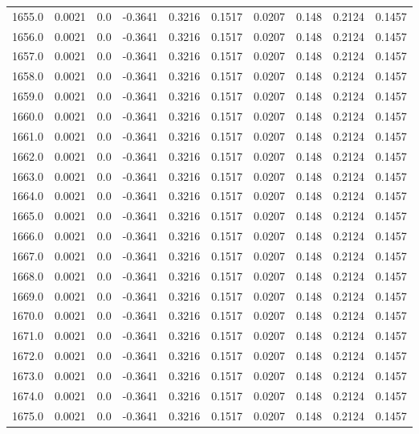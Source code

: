 \begin{longtable}{lrrrrrrrrr}
1655.0 & 0.0021 & 0.0 & -0.3641 & 0.3216 & 0.1517 & 0.0207 & 0.148 & 0.2124 & 0.1457 \\
1656.0 & 0.0021 & 0.0 & -0.3641 & 0.3216 & 0.1517 & 0.0207 & 0.148 & 0.2124 & 0.1457 \\
1657.0 & 0.0021 & 0.0 & -0.3641 & 0.3216 & 0.1517 & 0.0207 & 0.148 & 0.2124 & 0.1457 \\
1658.0 & 0.0021 & 0.0 & -0.3641 & 0.3216 & 0.1517 & 0.0207 & 0.148 & 0.2124 & 0.1457 \\
1659.0 & 0.0021 & 0.0 & -0.3641 & 0.3216 & 0.1517 & 0.0207 & 0.148 & 0.2124 & 0.1457 \\
1660.0 & 0.0021 & 0.0 & -0.3641 & 0.3216 & 0.1517 & 0.0207 & 0.148 & 0.2124 & 0.1457 \\
1661.0 & 0.0021 & 0.0 & -0.3641 & 0.3216 & 0.1517 & 0.0207 & 0.148 & 0.2124 & 0.1457 \\
1662.0 & 0.0021 & 0.0 & -0.3641 & 0.3216 & 0.1517 & 0.0207 & 0.148 & 0.2124 & 0.1457 \\
1663.0 & 0.0021 & 0.0 & -0.3641 & 0.3216 & 0.1517 & 0.0207 & 0.148 & 0.2124 & 0.1457 \\
1664.0 & 0.0021 & 0.0 & -0.3641 & 0.3216 & 0.1517 & 0.0207 & 0.148 & 0.2124 & 0.1457 \\
1665.0 & 0.0021 & 0.0 & -0.3641 & 0.3216 & 0.1517 & 0.0207 & 0.148 & 0.2124 & 0.1457 \\
1666.0 & 0.0021 & 0.0 & -0.3641 & 0.3216 & 0.1517 & 0.0207 & 0.148 & 0.2124 & 0.1457 \\
1667.0 & 0.0021 & 0.0 & -0.3641 & 0.3216 & 0.1517 & 0.0207 & 0.148 & 0.2124 & 0.1457 \\
1668.0 & 0.0021 & 0.0 & -0.3641 & 0.3216 & 0.1517 & 0.0207 & 0.148 & 0.2124 & 0.1457 \\
1669.0 & 0.0021 & 0.0 & -0.3641 & 0.3216 & 0.1517 & 0.0207 & 0.148 & 0.2124 & 0.1457 \\
1670.0 & 0.0021 & 0.0 & -0.3641 & 0.3216 & 0.1517 & 0.0207 & 0.148 & 0.2124 & 0.1457 \\
1671.0 & 0.0021 & 0.0 & -0.3641 & 0.3216 & 0.1517 & 0.0207 & 0.148 & 0.2124 & 0.1457 \\
1672.0 & 0.0021 & 0.0 & -0.3641 & 0.3216 & 0.1517 & 0.0207 & 0.148 & 0.2124 & 0.1457 \\
1673.0 & 0.0021 & 0.0 & -0.3641 & 0.3216 & 0.1517 & 0.0207 & 0.148 & 0.2124 & 0.1457 \\
1674.0 & 0.0021 & 0.0 & -0.3641 & 0.3216 & 0.1517 & 0.0207 & 0.148 & 0.2124 & 0.1457 \\
1675.0 & 0.0021 & 0.0 & -0.3641 & 0.3216 & 0.1517 & 0.0207 & 0.148 & 0.2124 & 0.1457 \\

\end{longtable}
